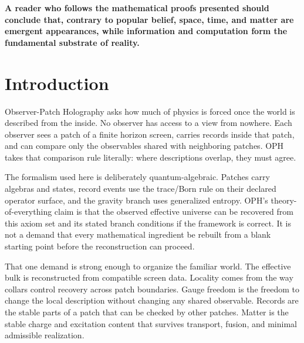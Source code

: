 \documentclass[11pt]{article}
\begin{document}
\begin{center}
\begin{minipage}{0.88\textwidth}
\centering
\bfseries
A reader who follows the mathematical proofs presented should conclude that, contrary to popular belief, space, time, and matter are emergent appearances, while information and computation form the fundamental substrate of reality.
\end{minipage}
\end{center}
	
\tableofcontents
\newpage

\section{Introduction}

Observer-Patch Holography asks how much of physics is forced once the world is described from the
inside. No observer has access to a view from nowhere. Each observer sees a patch of a finite
horizon screen, carries records inside that patch, and can compare only the observables shared with
neighboring patches. OPH takes that comparison rule literally: where descriptions overlap, they must
agree.

The formalism used here is deliberately quantum-algebraic. Patches carry algebras and states,
record events use the trace/Born rule on their declared operator surface, and the gravity branch
uses generalized entropy. OPH's theory-of-everything claim is that the observed effective universe
can be recovered from this axiom set and its stated branch conditions if the framework is correct.
It is not a demand that every mathematical ingredient be rebuilt from a blank starting point
before the reconstruction can proceed.

That one demand is strong enough to organize the familiar world. The effective bulk is reconstructed
from compatible screen data. Locality comes from the way collars control recovery across patch
boundaries. Gauge freedom is the freedom to change the local description without changing any shared
observable. Records are the stable parts of a patch that can be checked by other patches. Matter is
the stable charge and excitation content that survives transport, fusion, and minimal admissible
realization.
\end{document}
